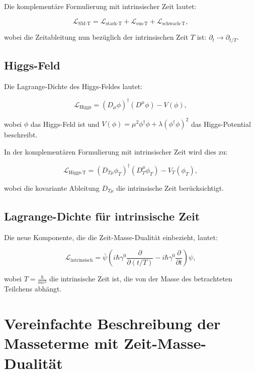 \documentclass{article}
\begin{document}
	Die komplementäre Formulierung mit intrinsischer Zeit lautet:
	
	\begin{equation}
		\mathcal{L}_\text{SM-T} = \mathcal{L}_\text{stark-T} + \mathcal{L}_\text{em-T} + \mathcal{L}_\text{schwach-T},
	\end{equation}
	
	wobei die Zeitableitung nun bezüglich der intrinsischen Zeit $T$ ist: $\partial_t \rightarrow \partial_{t/T}$.
	
	\subsection{Higgs-Feld}
	Die Lagrange-Dichte des Higgs-Feldes lautet:
	
	\begin{equation}
		\mathcal{L}_\text{Higgs} = (D_\mu \phi)^\dagger (D^\mu \phi) - V(\phi),
	\end{equation}
	
	wobei $\phi$ das Higgs-Feld ist und $V(\phi) = \mu^2 \phi^\dagger \phi + \lambda (\phi^\dagger \phi)^2$ das Higgs-Potential beschreibt.
	
	In der komplementären Formulierung mit intrinsischer Zeit wird dies zu:
	
	\begin{equation}
		\mathcal{L}_\text{Higgs-T} = (D_{T\mu} \phi_T)^\dagger (D_T^\mu \phi_T) - V_T(\phi_T),
	\end{equation}
	
	wobei die kovariante Ableitung $D_{T\mu}$ die intrinsische Zeit berücksichtigt.
	
	\subsection{Lagrange-Dichte für intrinsische Zeit}
	Die neue Komponente, die die Zeit-Masse-Dualität einbezieht, lautet:
	
	\begin{equation}
		\mathcal{L}_\text{intrinsisch} = \bar{\psi}\left(i\hbar\gamma^0 \frac{\partial}{\partial (t/T)} - i\hbar\gamma^0 \frac{\partial}{\partial t}\right)\psi,
	\end{equation}
	
	wobei $T = \frac{\hbar}{mc^2}$ die intrinsische Zeit ist, die von der Masse des betrachteten Teilchens abhängt.
	
	\section{Vereinfachte Beschreibung der Masseterme mit Zeit-Masse-Dualität}
	
\end{document}
